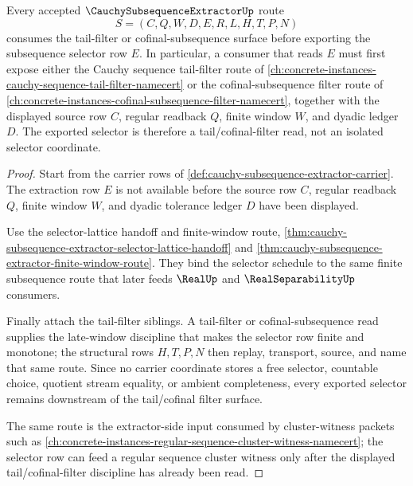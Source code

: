 \begin{theorem}
\label{thm:cauchy-subsequence-extractor-tail-filter-route}
Every accepted $\CauchySubsequenceExtractorUp$ route
$$
S=(C,Q,W,D,E,R,L,H,T,P,N)
$$
consumes the tail-filter or cofinal-subsequence surface before exporting the subsequence selector row $E$. In particular, a consumer that reads $E$ must first expose either the Cauchy sequence tail-filter route of \autoref{ch:concrete-instances-cauchy-sequence-tail-filter-namecert} or the cofinal-subsequence filter route of \autoref{ch:concrete-instances-cofinal-subsequence-filter-namecert}, together with the displayed source row $C$, regular readback $Q$, finite window $W$, and dyadic ledger $D$. The exported selector is therefore a tail/cofinal-filter read, not an isolated selector coordinate.
\end{theorem}
\begin{proof}
Start from the carrier rows of \autoref{def:cauchy-subsequence-extractor-carrier}. The extraction row $E$ is not available before the source row $C$, regular readback $Q$, finite window $W$, and dyadic tolerance ledger $D$ have been displayed.

Use the selector-lattice handoff and finite-window route, \autoref{thm:cauchy-subsequence-extractor-selector-lattice-handoff} and \autoref{thm:cauchy-subsequence-extractor-finite-window-route}. They bind the selector schedule to the same finite subsequence route that later feeds $\RealUp$ and $\RealSeparabilityUp$ consumers.

Finally attach the tail-filter siblings. A tail-filter or cofinal-subsequence read supplies the late-window discipline that makes the selector row finite and monotone; the structural rows $H,T,P,N$ then replay, transport, source, and name that same route. Since no carrier coordinate stores a free selector, countable choice, quotient stream equality, or ambient completeness, every exported selector remains downstream of the tail/cofinal filter surface.

The same route is the extractor-side input consumed by cluster-witness packets such as \autoref{ch:concrete-instances-regular-sequence-cluster-witness-namecert}; the selector row can feed a regular sequence cluster witness only after the displayed tail/cofinal-filter discipline has already been read.
\end{proof}

